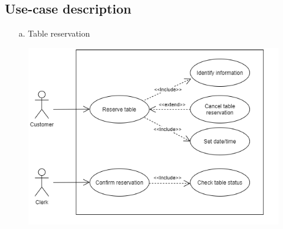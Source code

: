 \documentclass[11pt]{article}
\begin{document}
    \subsection{Use-case description}
        \begin{enumerate}
            \item[a.] Table reservation 
        \end{enumerate}
    \begin{figure}[h]
        \centering
        \includegraphics[scale=0.8]{Use-case diagram/TableReservation.png}
        \setlength{\parskip}{8pt}
    \end{figure}
        
\end{document}
